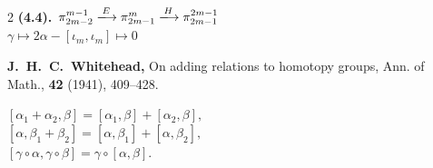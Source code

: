 \documentclass[10pt, leqno]{ltjsarticle}
\newcommand{\pit}[2]{\pi_{#1}^{#2}}
\numberwithin{equation}{section}
\theoremstyle{plain}
\theoremstyle{definition}
\theoremstyle{remark}
\begin{document}
\begin{paracol}{2}
\noindent
\textbf{(4.4).}\
\(\pit{2m-2}{m-1}\xlongrightarrow{E}
\pit{2m-1}{m}\xlongrightarrow{H}
\pit{2m-1}{2m-1}\)\\
\qquad\qquad\(\gamma\longmapsto 2\alpha-[\iota_m, \iota_m]\longmapsto 0\)

\noindent
\textbf{\cite{Whitehead1941}
J.~H.~C.~Whitehead,}
\newblock On adding relations to homotopy groups,
\newblock Ann. of Math., {\bf 42} (1941), 409--428.

\noindent
\([\alpha_1+\alpha_2, \beta] =
[\alpha_1, \beta] + [\alpha_2, \beta],\)\\
\([\alpha, \beta_1 + \beta_2] =
[\alpha, \beta_1] + [\alpha, \beta_2],\)\\
\([\gamma\circ\alpha, \gamma\circ\beta] = 
\gamma\circ[\alpha, \beta].\)



\end{paracol}

\newpage
\end{document}
